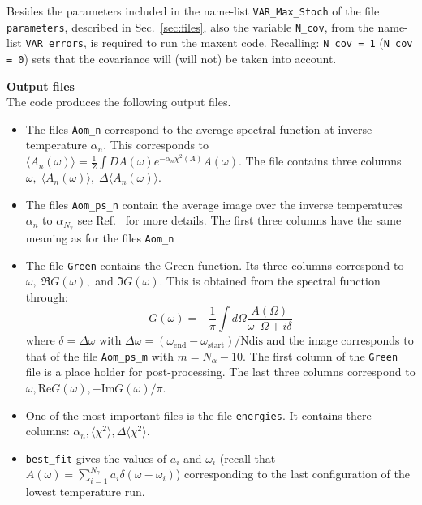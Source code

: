 Besides the parameters included in the name-list \texttt{VAR\_Max\_Stoch} of the file \texttt{parameters}, described in Sec.~\ref{sec:files}, also the variable \texttt{N\_cov}, from the name-list \texttt{VAR\_errors}, is required to run the maxent code. Recalling: \texttt{N\_cov = 1} (\texttt{N\_cov = 0}) sets that the covariance will (will not) be taken into account.


\noindent
\textbf{Output files} \\
The code produces  the following output files.
\begin{itemize}
\item The files  \texttt{Aom\_n}  correspond to the average spectral function at inverse  temperature  $ \alpha_n $. This corresponds to
$  \langle A_n(\omega) \rangle =   \frac{1}{Z}   \int DA(\omega)    e^{-\alpha_n \chi^{2}(A)  } A(\omega). $
The file contains three columns  $ \omega, \;  \langle A_n(\omega) \rangle , \;  \Delta \langle A_n(\omega) \rangle $.

\item The files \texttt{Aom\_ps\_n}   contain the average image over  the  inverse   temperatures  $ \alpha_n $ to $ \alpha_{N_\gamma} $  see Ref.~\cite{Beach04a} for more details.   
 The first three columns have the same meaning as for the files \texttt{Aom\_n}

\item The file \texttt{Green} contains the Green function. Its three columns correspond to $ \omega, \;   \Re G(\omega),$ and $\Im G(\omega)  $.  This is obtained from the spectral function through:
\begin{equation}
 G(\omega) =  -\frac{1}{\pi} \int d \Omega   \frac{A(\Omega)}{\omega – \Omega + i \delta}
 \end{equation}
where  $ \delta =  \Delta \omega$ with $ \Delta \omega = (\omega_\text{end} -  \omega_\text{start})/\text{Ndis}$ and the image corresponds to that of the file \texttt{Aom\_ps\_m} with $ m = N_{\alpha} -10 $. 
The first column of the  \texttt{Green}  file is a place holder for post-processing. The last three columns   correspond to $\omega, \text{Re} G(\omega) ,   - \text{Im} G(\omega)/\pi $. 

\item  One of the most important files is the file  \texttt{energies}. It contains there columns:  $ \alpha_n, \langle \chi^2 \rangle, \Delta \langle \chi^2 \rangle $.

\item   \texttt{best\_fit}  gives the values of $a_i$ and $\omega_i$   (recall that $ A(\omega)  = \sum_{i=1}^{N_{\gamma}} a_{i} \delta \left( \omega - \omega_i \right)$) corresponding to the last configuration of the  lowest temperature run.


\end{itemize}
